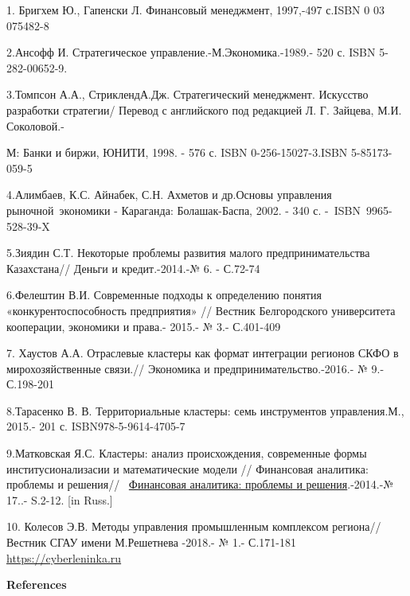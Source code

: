 \begin{references}

1. Бригхем Ю., Гапенски Л. Финансовый менеджмент, 1997,-497 с.ISBN 0 03
075482-8

2.Ансофф И. Стратегическое управление.-М.Экономика.-1989.- 520 с. ISBN
5-282-00652-9.

3.Томпсон А.А., СтриклендА.Дж. Стратегический менеджмент. Искусство
разработки стратегии/ Перевод с английского под редакцией Л. Г. Зайцева,
М.И. Соколовой.-

М: Банки и биржи, ЮНИТИ, 1998. - 576 с. ISBN 0-256-15027-3.ISBN
5-85173-059-5

4.Алимбаев, К.С. Айнабек, С.Н. Ахметов и др.Основы управления
рыночной~экономики - Караганда: Болашак-Баспа, 2002. - 340 с.
-~ISBN~9965-528-39-X

5.Зиядин С.Т. Некоторые проблемы развития малого предпринимательства
Казахстана// Деньги и кредит.-2014.-№ 6. - С.72-74

6.Фелештин В.И. Современные подходы к определению понятия
«конкурентоспособность предприятия» // Вестник Белгородского
университета кооперации, экономики и права.- 2015.- № 3.- С.401-409

7. Хаустов А.А. Отраслевые кластеры как формат интеграции регионов СКФО
в мирохозяйственные связи.// Экономика и предпринимательство.-2016.- №
9.- С.198-201

8.Тарасенко В. В. Территориальные кластеры: семь инструментов
управления.М., 2015.- 201 с. \linebreak ISBN978-5-9614-4705-7

9.Матковская Я.С. Кластеры: анализ происхождения, современные формы
институсионализасии и математические модели // Финансовая аналитика:
проблемы и решения//
~\href{https://www.fin-izdat.ru/journal/fa/}{Финансовая аналитика:
проблемы и решения}.-2014.-№ 17..- S.2-12. [in Russ.]

10. Колесов Э.В. Методы управления промышленным комплексом региона//
Вестник СГАУ имени М.Решетнева -2018.- № 1.- С.171-181
\href{https://cyberleninka.ru/article/n/metody-upravleniya-promyshlennym-kompleksom-regiona}{https://cyberleninka.ru}
\end{references}

\begin{center}
{\bfseries References}
\end{center}

